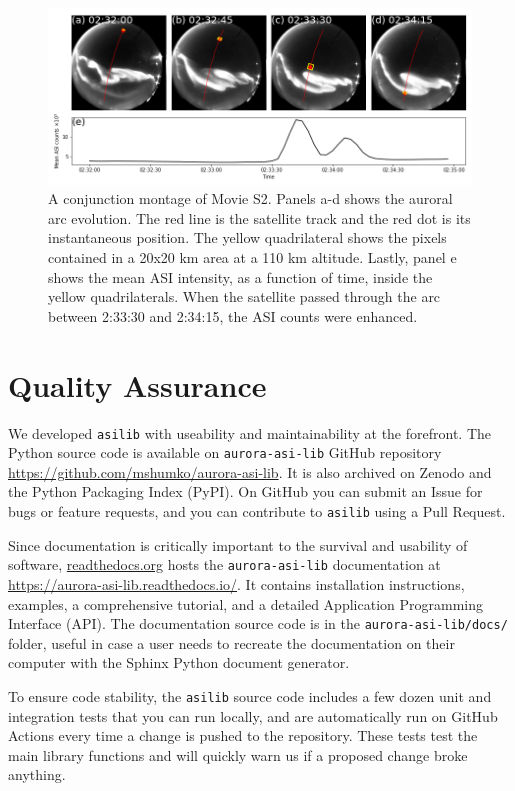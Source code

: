 \documentclass[draft]{agujournal2019}
\begin{document}
\begin{figure}
      \includegraphics[width=\textwidth]{figures/fig4.png}
      \caption{A conjunction montage of Movie S2. Panels a-d shows the auroral arc evolution. The red line is the satellite track and the red dot is its instantaneous position. The yellow quadrilateral shows the pixels contained in a 20x20 km area at a 110 km altitude. Lastly, panel e shows the mean ASI intensity, as a function of time, inside the yellow quadrilaterals. When the satellite passed through the arc between 2:33:30 and 2:34:15, the ASI counts were enhanced.}
      \label{fig4}
\end{figure}

\section{Quality Assurance}
We developed \verb|asilib| with useability and maintainability at the forefront. The Python source code is available on \verb|aurora-asi-lib| GitHub repository \url{https://github.com/mshumko/aurora-asi-lib}. It is also archived on Zenodo and the Python Packaging Index (PyPI). On GitHub you can submit an Issue for bugs or feature requests, and you can contribute to \verb|asilib| using a Pull Request. 

Since documentation is critically important to the survival and usability of software, \url{readthedocs.org} hosts the \verb|aurora-asi-lib| documentation at \url{https://aurora-asi-lib.readthedocs.io/}. It contains installation instructions, examples, a comprehensive tutorial, and a detailed Application Programming Interface (API). The documentation source code is in the \verb|aurora-asi-lib/docs/| folder, useful in case a user needs to recreate the documentation on their computer with the Sphinx Python document generator.

To ensure code stability, the \verb|asilib| source code includes a few dozen unit and integration tests that you can run locally, and are automatically run on GitHub Actions every time a change is pushed to the repository. These tests test the main library functions and will quickly warn us if a proposed change broke anything.
\end{document}
